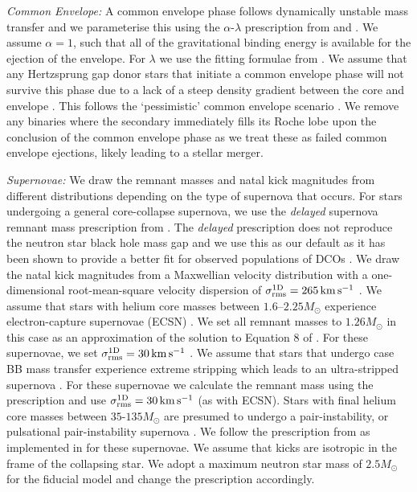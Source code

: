 \textit{Common Envelope:} A common envelope phase follows dynamically unstable mass transfer and we parameterise this using the $\alpha$-$\lambda$ prescription from \citet{Webbink+1984} and \citet{deKool+1990}. We assume $\alpha = 1$, such that all of the gravitational binding energy is available for the ejection of the envelope. For $\lambda$ we use the fitting formulae from \citet{Xu+2010, Xu+2010a}. We assume that any Hertzsprung gap donor stars that initiate a common envelope phase will not survive this phase due to a lack of a steep density gradient between the core and envelope \citep{Taam+2000, Ivanova+2004, Klencki+2021}. This follows the `pessimistic' common envelope scenario \citep[c.f.][]{Belczynski+2007}. We remove any binaries where the secondary immediately fills its Roche lobe upon the conclusion of the common envelope phase as we treat these as failed common envelope ejections, likely leading to a stellar merger.

\textit{Supernovae:} We draw the remnant masses and natal kick magnitudes from different distributions depending on the type of supernova that occurs. For stars undergoing a general core-collapse supernova, we use the \textit{delayed} supernova remnant mass prescription from \citet{Fryer+2012}. The \textit{delayed} prescription does not reproduce the neutron star black hole mass gap and we use this as our default as it has been shown to provide a better fit for observed populations of DCOs \citep[e.g.][]{Vigna-Gomez+2018}. We draw the natal kick magnitudes from a Maxwellian velocity distribution with a one-dimensional root-mean-square velocity dispersion of $\sigma_{\rm rms}^{\rm 1D} = 265 \unit{km}{s^{-1}}$ \citep{Lyne+1994, Hobbs+2005}. We assume that stars with helium core masses between $1.6$--$2.25 \unit{M_{\odot}}$ \citep{Hurley+2002} experience electron-capture supernovae (ECSN) \citep{Nomoto+1984, Nomoto+1987, Ivanova+2008}. We set all remnant masses to $1.26 \unit{M_{\odot}}$ in this case as an approximation of the solution to Equation 8 of \citet{Timmes+1996}. For these supernovae, we set $\sigma_{\rm rms}^{\rm 1D} = 30 \unit{km}{s^{-1}}$ \citep[e.g.][]{Pfahl+2002, Podsiadlowski+2004}. We assume that stars that undergo case BB mass transfer \citep{Dewi+2002} experience extreme stripping which leads to an ultra-stripped supernova \citep{Tauris+2013, Tauris+2015}. For these supernovae we calculate the remnant mass using the \citet{Fryer+2012} prescription and use $\sigma_{\rm rms}^{\rm 1D} = 30 \unit{km}{s^{-1}}$ (as with ECSN). Stars with final helium core masses between $35$-$135 \unit{M_{\odot}}$ are presumed to undergo a pair-instability, or pulsational pair-instability supernova \citep[e.g.][]{Woosley+2007, Farmer+2019}. We follow the prescription from \citet{Marchant+2019} as implemented in \citep{Stevenson+2019} for these supernovae. We assume that kicks are isotropic in the frame of the collapsing star. We adopt a maximum neutron star mass of $2.5 \unit{M_{\odot}}$ \citep[e.g.][]{Kalogera+1996, Fryer+2015, Margalit+2017} for the fiducial model and change the \citet{Fryer+2012} prescription accordingly.

